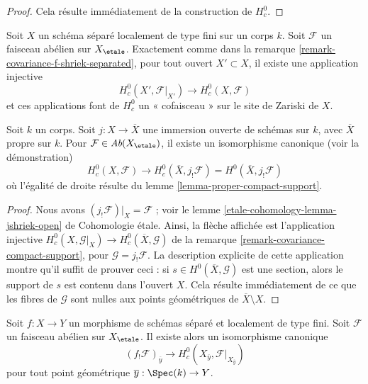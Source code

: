 \begin{proof}
Cela résulte immédiatement de la construction de $H^0_c$.
\end{proof}

\begin{remark}
\label{remark-covariance-compact-support}
Soit $X$ un schéma séparé localement de type fini sur un corps $k$.
Soit $\mathcal{F}$ un faisceau abélien sur $X_\etale$.
Exactement comme dans la remarque \ref{remark-covariance-f-shriek-separated},
pour tout ouvert $X' \subset X$, il existe une application injective
$$
H^0_c(X', \mathcal{F}|_{X'}) \longrightarrow H^0_c(X, \mathcal{F})
$$
et ces applications font de $H^0_c$ un « cofaisceau » sur le site de Zariski de $X$.
\end{remark}

\begin{lemma}
\label{lemma-compactify-compact-support}
Soit $k$ un corps. Soit $j : X \to \overline{X}$ une immersion
ouverte de schémas sur $k$, avec $\overline{X}$ propre sur $k$.
Pour $\mathcal{F} \in \textit{Ab}(X_\etale)$,
il existe un isomorphisme canonique (voir la démonstration)
$$
H^0_c(X, \mathcal{F}) \longrightarrow
H^0_c(\overline{X}, j_!\mathcal{F}) =
H^0(\overline{X}, j_!\mathcal{F})
$$
où l'égalité de droite résulte du
lemme \ref{lemma-proper-compact-support}.
\end{lemma}

\begin{proof}
Nous avons $(j_!\mathcal{F})|_X = \mathcal{F}$ ; voir le
lemme \ref{etale-cohomology-lemma-jshriek-open} de Cohomologie étale.
Ainsi, la flèche affichée est l'application injective
$H^0_c(X, \mathcal{G}|_X) \to H^0_c(\overline{X}, \mathcal{G})$
de la remarque \ref{remark-covariance-compact-support},
pour $\mathcal{G} = j_!\mathcal{F}$. La description explicite
de cette application montre qu'il suffit de prouver ceci : si
$s \in H^0(\overline{X}, \mathcal{G})$ est une section, alors le support de
$s$ est contenu dans l'ouvert $X$. Cela résulte immédiatement de ce que
les fibres de $\mathcal{G}$ sont nulles aux points géométriques
de $\overline{X} \setminus X$.
\end{proof}

\begin{lemma}
\label{lemma-stalk-f-shriek-separated}
Soit $f : X \to Y$ un morphisme de schémas séparé et
localement de type fini. Soit $\mathcal{F}$ un faisceau abélien sur
$X_\etale$. Il existe alors un isomorphisme canonique
$$
(f_!\mathcal{F})_{\overline{y}}
\longrightarrow
H^0_c(X_{\overline{y}}, \mathcal{F}|_{X_{\overline{y}}})
$$
pour tout point géométrique $\overline{y} : \Spec(k) \to Y$.
\end{lemma}


